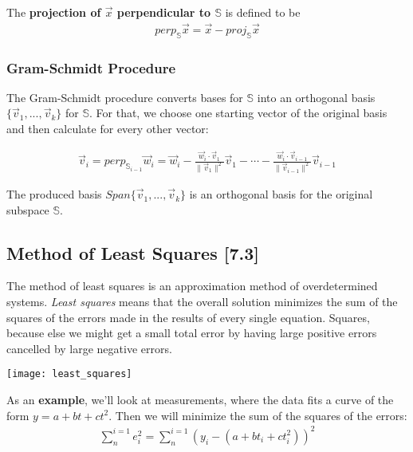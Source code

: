 \documentclass[a4paper,9pt]{extarticle}
\begin{document}
\begin{multicols*}{2}
The \textbf{projection of $\vec{x}$ perpendicular to $\mathbb{S}$} is defined to be
\begin{equation} \label{7.2-3}
    \begin{split}
        perp_\mathbb{S} \vec{x} = \vec{x} - proj_\mathbb{S} \vec{x}
    \end{split}
\end{equation}


\subsubsection{Gram-Schmidt Procedure}
The Gram-Schmidt procedure converts bases for $\mathbb{S}$ into an orthogonal basis $\{\vec{v}_1, ..., \vec{v}_k\}$ for $\mathbb{S}$. For that, we choose one starting vector of the original basis and then calculate for every other vector:

\begin{equation} \label{7.2-4}
    \begin{split}
        \vec{v}_i = perp_{\mathbb{S}_{i - 1}} \vec{w}_i = \vec{w}_i - \frac{\vec{w}_i \cdot \vec{v}_1}{\|\vec{v}_1\|^2} \vec{v}_1 - \cdots - \frac{\vec{w}_i \cdot \vec{v}_{i - 1}}{\|\vec{v}_{i - 1}\|^2} \vec{v}_{i - 1}
    \end{split}
\end{equation}

The produced basis $Span \{\vec{v}_1, ..., \vec{v}_k\}$ is an orthogonal basis for the original subspace $\mathbb{S}$.


\subsection{Method of Least Squares [7.3]}
The method of least squares is an approximation method of overdetermined systems. \textit{Least squares} means that the overall solution minimizes the sum of the squares of the errors made in the results of every single equation. Squares, because else we might get a small total error by having large positive errors cancelled by large negative errors.

{\centering \texttt{[image: least\_squares]} \par}

As an \textbf{example}, we'll look at measurements, where the data fits a curve of the form $y = a + bt + ct^2$. Then we will minimize the sum of the squares of the errors:
\begin{equation} \label{7.3-1}
    \begin{split}
        \sum_{n}^{i = 1} e_i^2 = \sum_{n}^{i = 1} (y_i - (a + bt_i + ct_i^2))^2
    \end{split}
\end{equation}


\end{multicols*}
\end{document}
